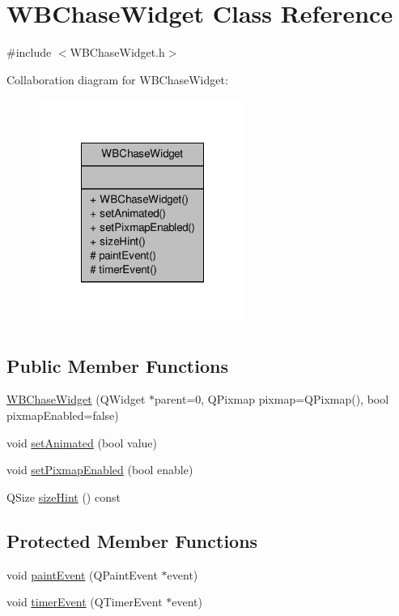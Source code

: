 \hypertarget{class_w_b_chase_widget}{\section{W\-B\-Chase\-Widget Class Reference}
\label{d5/ddf/class_w_b_chase_widget}
}


{\ttfamily \#include $<$W\-B\-Chase\-Widget.\-h$>$}



Collaboration diagram for W\-B\-Chase\-Widget\-:
\nopagebreak
\begin{figure}[H]
\begin{center}
\leavevmode
\includegraphics[width=192pt]{d9/d43/class_w_b_chase_widget__coll__graph}
\end{center}
\end{figure}
\subsection*{Public Member Functions}
\begin{DoxyCompactItemize}
\item 
\hyperlink{class_w_b_chase_widget_a1f4ca896fa8124b09ce3f925bda88c95}{W\-B\-Chase\-Widget} (Q\-Widget $\ast$parent=0, Q\-Pixmap pixmap=Q\-Pixmap(), bool pixmap\-Enabled=false)
\item 
void \hyperlink{class_w_b_chase_widget_aa65e948e3aa9b1838b889a94350e46fe}{set\-Animated} (bool value)
\item 
void \hyperlink{class_w_b_chase_widget_abc0e29c500dd807444662f8dd7f6cef9}{set\-Pixmap\-Enabled} (bool enable)
\item 
Q\-Size \hyperlink{class_w_b_chase_widget_a151f09c7596c89df73ac712a9e15237d}{size\-Hint} () const 
\end{DoxyCompactItemize}
\subsection*{Protected Member Functions}
\begin{DoxyCompactItemize}
\item 
void \hyperlink{class_w_b_chase_widget_a1eef04520f2d6a053e43d00baf68b211}{paint\-Event} (Q\-Paint\-Event $\ast$event)
\item 
void \hyperlink{class_w_b_chase_widget_adae651074684021a308e0f2a9acc2fc6}{timer\-Event} (Q\-Timer\-Event $\ast$event)
\end{DoxyCompactItemize}


